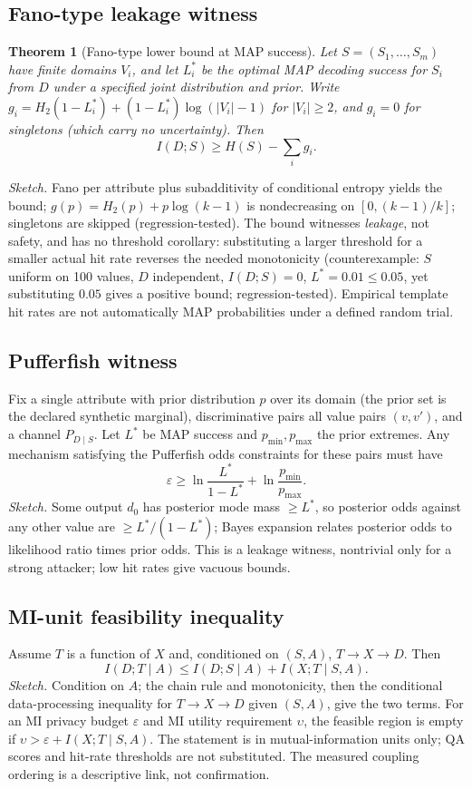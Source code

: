 \documentclass[journal]{IEEEtran}
\newtheorem{theorem}{Theorem}
\begin{document}
\subsection{Fano-type leakage witness}
\begin{theorem}[Fano-type lower bound at MAP success]
Let $S=(S_1,\dots,S_m)$ have finite domains $V_i$, and let $L_i^{*}$ be the optimal MAP decoding success for $S_i$ from $D$ under a specified joint distribution and prior. Write $g_i=H_2(1-L_i^{*})+(1-L_i^{*})\log(|V_i|-1)$ for $|V_i|\ge2$, and $g_i=0$ for singletons (which carry no uncertainty). Then
\[
I(D;S)\ge H(S)-\textstyle\sum_i g_i.
\]
\end{theorem}
\emph{Sketch.} Fano per attribute plus subadditivity of conditional entropy yields the bound; $g(p)=H_2(p)+p\log(k-1)$ is nondecreasing on $[0,(k-1)/k]$; singletons are skipped (regression-tested). The bound witnesses \emph{leakage}, not safety, and has no threshold corollary: substituting a larger threshold for a smaller actual hit rate reverses the needed monotonicity (counterexample: $S$ uniform on 100 values, $D$ independent, $I(D;S)=0$, $L^{*}=0.01\le0.05$, yet substituting $0.05$ gives a positive bound; regression-tested). Empirical template hit rates are not automatically MAP probabilities under a defined random trial.

\subsection{Pufferfish witness}
Fix a single attribute with prior distribution $p$ over its domain (the prior set is the declared synthetic marginal), discriminative pairs all value pairs $(v,v')$, and a channel $P_{D\mid S}$. Let $L^{*}$ be MAP success and $p_{\min},p_{\max}$ the prior extremes. Any mechanism satisfying the Pufferfish odds constraints for these pairs must have
\[
\varepsilon\ge\ln\frac{L^{*}}{1-L^{*}}+\ln\frac{p_{\min}}{p_{\max}}.
\]
\emph{Sketch.} Some output $d_0$ has posterior mode mass $\ge L^{*}$, so posterior odds against any other value are $\ge L^{*}/(1-L^{*})$; Bayes expansion relates posterior odds to likelihood ratio times prior odds. This is a leakage witness, nontrivial only for a strong attacker; low hit rates give vacuous bounds.

\subsection{MI-unit feasibility inequality}
Assume $T$ is a function of $X$ and, conditioned on $(S,A)$, $T\to X\to D$. Then
\[
I(D;T\mid A)\le I(D;S\mid A)+I(X;T\mid S,A).
\]
\emph{Sketch.} Condition on $A$; the chain rule and monotonicity, then the conditional data-processing inequality for $T\to X\to D$ given $(S,A)$, give the two terms. For an MI privacy budget $\varepsilon$ and MI utility requirement $\upsilon$, the feasible region is empty if $\upsilon>\varepsilon+I(X;T\mid S,A)$. The statement is in mutual-information units only; QA scores and hit-rate thresholds are not substituted. The measured coupling ordering is a descriptive link, not confirmation.
\end{document}

